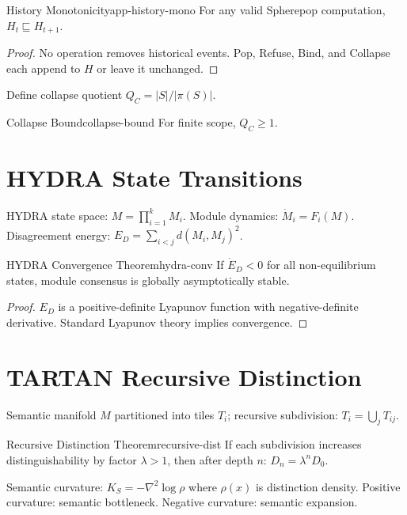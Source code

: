 \documentclass[12pt,twoside,openright]{book}
\begin{document}
\begin{theorem}{History Monotonicity}{app-history-mono}
  For any valid Spherepop computation,
  $H_t \sqsubseteq H_{t+1}$.
\end{theorem}

\begin{proof}
  No operation removes historical events.
  Pop, Refuse, Bind, and Collapse each append to $H$
  or leave it unchanged.
\end{proof}

Define collapse quotient $Q_C = |S| / |\pi(S)|$.

\begin{theorem}{Collapse Bound}{collapse-bound}
  For finite scope, $Q_C \ge 1$.
\end{theorem}

\section{HYDRA State Transitions}

HYDRA state space: $M = \prod_{i=1}^k M_i$.
Module dynamics: $\dot{M}_i = F_i(M)$.
Disagreement energy: $E_D = \sum_{i<j} d(M_i, M_j)^2$.

\begin{theorem}{HYDRA Convergence Theorem}{hydra-conv}
  If $\dot{E}_D < 0$ for all non-equilibrium states,
  module consensus is globally asymptotically stable.
\end{theorem}

\begin{proof}
  $E_D$ is a positive-definite Lyapunov function with
  negative-definite derivative. Standard Lyapunov theory
  implies convergence.
\end{proof}

\section{TARTAN Recursive Distinction}

Semantic manifold $M$ partitioned into tiles $T_i$;
recursive subdivision: $T_i = \bigcup_j T_{ij}$.

\begin{theorem}{Recursive Distinction Theorem}{recursive-dist}
  If each subdivision increases distinguishability by
  factor $\lambda > 1$, then after depth $n$:
  $D_n = \lambda^n D_0$.
\end{theorem}

Semantic curvature: $K_S = -\nabla^2\log\rho$
where $\rho(x)$ is distinction density.
Positive curvature: semantic bottleneck.
Negative curvature: semantic expansion.
\end{document}
